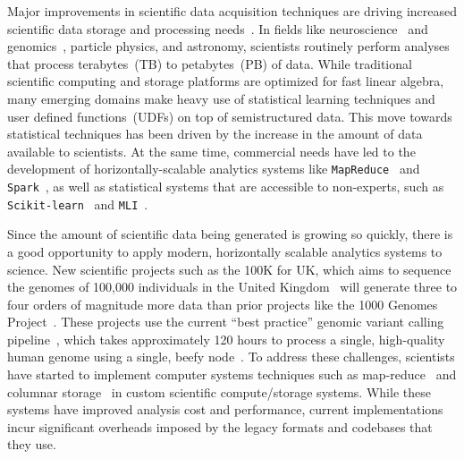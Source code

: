 \documentclass{sig-alternate}
\begin{document}
Major improvements in scientific data acquisition techniques are driving increased scientific data storage and
processing needs~\cite{cunningham14, schadt10}. In fields like
neuroscience~\cite{freeman14} and \linebreak genomics~\cite{stein10}, particle physics, and astronomy,
scientists routinely perform analyses that process terabytes~(TB) to \linebreak petabytes~(PB) of data.
While traditional scientific computing and storage platforms are optimized for fast linear algebra, many emerging
domains make heavy use of statistical learning techniques and user defined functions~(UDFs) on top of
semistructured data. This move towards statistical techniques has been driven by the increase in the
amount of data available to scientists. At the same time, commercial needs have led to the development of
horizontally-scalable analytics systems like \texttt{MapReduce}~\cite{dean04, dean08} and
\texttt{Spark}~\cite{zaharia10}, as well as statistical systems that are accessible to non-experts, such as
\texttt{Scikit-learn}~\cite{pedregosa11} and \texttt{MLI}~\cite{sparks13}.

Since the amount of scientific data being generated is growing so quickly, there is a good opportunity to apply
modern, horizontally scalable analytics systems to science. New scientific
projects such as the 100K for UK, which aims to sequence the genomes of 100,000 individuals in the
United Kingdom~\cite{uk100k} will generate three to four orders of magnitude more data than
prior projects like the 1000 Genomes Project~\cite{siva08}. These projects use the current ``best
practice'' genomic variant calling pipeline~\cite{auwera13}, which takes approximately 120 hours to
process a single, high-quality human genome using a single, beefy node~\cite{talwalkar14}. To address
these challenges, scientists have started to implement computer systems techniques such as
map-reduce~\cite{mckenna10} and columnar storage~\cite{fritz11} in custom
scientific compute/storage systems. While these systems have improved analysis cost and performance,
current implementations incur significant overheads imposed by the legacy formats and
codebases that they use.
\end{document}
